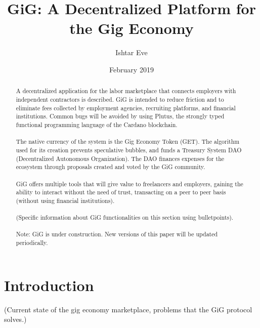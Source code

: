 \documentclass{article}
\title{GiG: A Decentralized Platform for the Gig Economy}
\author{Ishtar Eve}
\date{February 2019}
\begin{document}
   \maketitle
   \begin{abstract}
A decentralized application for the labor marketplace that connects employers with independent contractors is described. GiG is intended to reduce friction and to eliminate fees collected by employment agencies, recruiting platforms, and financial institutions. Common bugs will be avoided by using Plutus, the strongly typed functional programming language of the Cardano blockchain. 

\paragraph{} The native currency of the system is the Gig Economy Token (GET). The algorithm used for its creation prevents speculative bubbles, and funds a Treasury System DAO (Decentralized Autonomous Organization). The DAO finances expenses for the ecosystem through proposals created and voted by the GiG community.

\paragraph{} GiG offers multiple tools that will give value to freelancers and employers, gaining the ability to interact without the need of trust, transacting on a peer to peer basis (without using financial institutions).

\paragraph{}(Specific information about GiG functionalities on this section using bulletpoints).

\paragraph{} Note: GiG is under construction. New versions of this paper will be updated periodically.

\end{abstract}

\section{Introduction}

(Current state of the gig economy marketplace, problems that the GiG protocol solves.)
\end{document}

